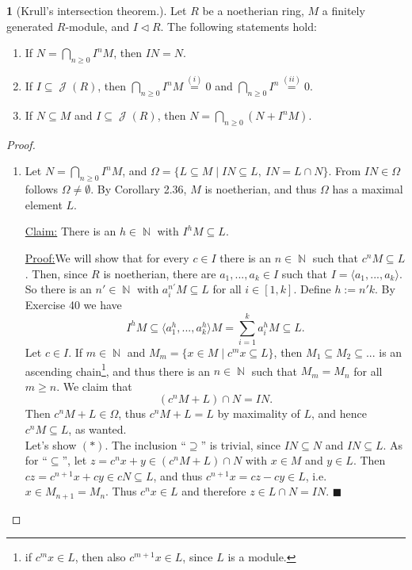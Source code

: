 \documentclass[12pt,a4paper]{report}
\theoremstyle{definition}
\theoremstyle{num.custom-title}
\newtheorem{teo_custom-title}[theorem]{} %
\newenvironment{claim}[1]{\par\noindent\underline{Claim#1:}\space}{} %
\newenvironment{claimproof}[1]{\par\noindent\underline{Proof:}\space#1}{\leavevmode\unskip\penalty9999 \hbox{}\nobreak\hfill\quad\hbox{$\blacksquare$}} %
\DeclareMathOperator{\J}{\mathcal{J}}
\DeclareMathOperator{\N}{\mathbb{N}}
\DeclareMathOperator{\sse}{\subseteq}
\begin{document}
\begin{teo_custom-title}[Krull's intersection theorem.]
Let $R$ be a noetherian ring, $M$ a finitely generated $R$-module, and $I \lhd R$. The following statements hold:
\begin{enumerate}
\item If $N = \displaystyle\bigcap_{n \geq 0} I^n M$, then $I N = N$.
\item If $I \sse \J(R)$, then $\displaystyle\bigcap_{n \geq 0} I^n M \stackrel{(i)}{=} 0$ and $\displaystyle\bigcap_{n \geq 0} I^n \stackrel{(ii)}{=} 0$.
\item If $N \sse M$ and $I \sse \J(R)$, then $N = \displaystyle\bigcap_{n \geq 0} (N + I^n M)$.
\end{enumerate}
\begin{proof}\ 
\begin{enumerate}
\item Let $N=\bigcap_{n \geq 0} I^n M$, and $\Omega = \{L \sse M \mid IN \sse L, \ IN=L \cap N \}$. From $IN \in \Omega$ follows $\Omega \neq \emptyset$. By Corollary 2.36, $M$ is noetherian, and thus $\Omega$ has a maximal element $L$.
\begin{claim}{}
There is an $h \in \N$ with $I^h M \sse L$.
\begin{claimproof}
We will show that for every $c \in I$ there is an $n \in \N$ such that $c^n M \sse L$. Then, since $R$ is noetherian, there are $a_1,...,a_k \in I$ such that $I = \langle a_1,...,a_k \rangle$. So there is an $n' \in \N$ with $a_i^{n'} M \sse L$ for all $i \in [1,k]$. Define $h:=n'k$. By Exercise 40 we have 
\[
I^h M \sse \langle a_1^h,...,a_k^h \rangle M = \sum_{i=1}^k a_i^h M \sse L.
\]
Let $c \in I$. If $m \in \N$ and $M_m = \{x \in M \mid c^m x \sse L\}$, then $M_1 \sse M_2 \sse ...$ is an ascending chain\footnote{if $c^m x \in L$, then also $c^{m+1}x \in L$, since $L$ is a module.}, and thus there is an $n \in \N$ such that $M_m = M_n$ for all $m \geq n$. We claim that
\[
(c^n M + L) \cap N = IN. \tag{$*$}
\]
Then $c^n M + L \in \Omega$, thus $c^n M + L= L$ by maximality of $L$, and hence $c^n M \sse L$, as wanted.\\
Let's show $(*)$. The inclusion ``$\supseteq$'' is trivial, since $IN \sse N$ and $IN \sse L$. As for ``$\sse$'', let $z = c^n x + y \in (c^n M + L) \cap N$ with $x \in M$ and $y \in L$. Then $c z = c^{n+1} x + cy \in cN \sse L$, and thus $c^{n+1}x = cz - cy \in L$, i.e. $x \in M_{n+1} = M_n$. Thus $c^n x \in L$ and therefore $z \in L \cap N = IN$.
\end{claimproof}
\end{claim}\ \\

\end{enumerate}
\end{proof}
\end{teo_custom-title}
\end{document}
